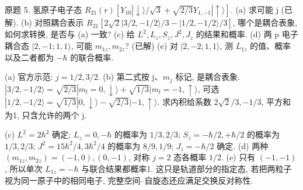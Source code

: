 \begin{exercise}\label{ex:2202-5-5}
原题 5. 氢原子电子态 $R_{21}(r)[Y_{10}|\downarrow\rangle/\sqrt3+\sqrt{2/3}Y_{1,-1}|\uparrow\rangle]$. (a) 求可能 j (已解). (b) 对照耦合表示 $R_{21}[2\sqrt2|3/2,-1/2\rangle/3-|1/2,-1/2\rangle/3]$, 哪个是耦合表象, 如何求转换, 是否与 (a) 一致? (c) 给 $L^2,L_z,S_z,J^2,J_z$ 的结果和概率. (d) 两 p 电子耦合态 $|2,-1;1,1\rangle$, 可能 $m_{1z},m_{2z}$? (已解) (e) 对 $|2,-2;1,1\rangle$, 测 $L_{1z}$ 的值、概率以及二者都为 $-\hbar$ 的联合概率.
\end{exercise}
\begin{solution}
(a) 官方示范: $j=1/2,3/2$. (b) 第二式按 j、$m_j$ 标记, 是耦合表象. $|3/2,-1/2\rangle=\sqrt{2/3}|m_l=0,\downarrow\rangle+\sqrt{1/3}|m_l=-1,\uparrow\rangle$, 可选 $|1/2,-1/2\rangle=\sqrt{1/3}|0,\downarrow\rangle-\sqrt{2/3}|-1,\uparrow\rangle$. 求内积给系数 $2\sqrt2/3,-1/3$, 平方和为1, 只含允许的两个 j.

(c) $L^2=2\hbar^2$ 确定; $L_z=0,-\hbar$ 的概率为 $1/3,2/3$; $S_z=-\hbar/2,+\hbar/2$ 的概率为 $1/3,2/3$; $J^2=15\hbar^2/4,3\hbar^2/4$ 的概率为 $8/9,1/9$; $J_z=-\hbar/2$ 确定. (d) 两种 $(m_{1z},m_{2z})=(-1,0),(0,-1)$, 对称 $j=2$ 态各概率 $1/2$. (e) 只有 $(-1,-1)$, 所以单次 $L_{1z}=-\hbar$ 与联合结果都概率1. 这只是轨道部分的指定态, 若把两粒子视为同一原子中的相同电子, 完整空间--自旋态还应满足交换反对称性.
\end{solution}
